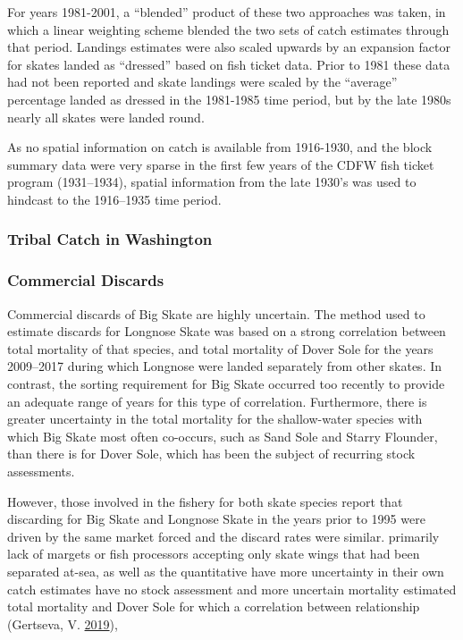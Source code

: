 \documentclass[12pt,]{article}
\begin{document}
For years 1981-2001, a ``blended'' product of these two approaches was
taken, in which a linear weighting scheme blended the two sets of catch
estimates through that period. Landings estimates were also scaled
upwards by an expansion factor for skates landed as ``dressed'' based on
fish ticket data. Prior to 1981 these data had not been reported and
skate landings were scaled by the ``average'' percentage landed as
dressed in the 1981-1985 time period, but by the late 1980s nearly all
skates were landed round.

As no spatial information on catch is available from 1916-1930, and the
block summary data were very sparse in the first few years of the CDFW
fish ticket program (1931--1934), spatial information from the late
1930's was used to hindcast to the 1916--1935 time period.

\hypertarget{tribal-catch-in-washington}{%
\subsubsection{Tribal Catch in
Washington}\label{tribal-catch-in-washington}}

\hypertarget{commercial-discards}{%
\subsubsection{Commercial Discards}\label{commercial-discards}}

Commercial discards of Big Skate are highly uncertain. The method used
to estimate discards for Longnose Skate was based on a strong
correlation between total mortality of that species, and total mortality
of Dover Sole for the years 2009--2017 during which Longnose were landed
separately from other skates. In contrast, the sorting requirement for
Big Skate occurred too recently to provide an adequate range of years
for this type of correlation. Furthermore, there is greater uncertainty
in the total mortality for the shallow-water species with which Big
Skate most often co-occurs, such as Sand Sole and Starry Flounder, than
there is for Dover Sole, which has been the subject of recurring stock
assessments.

However, those involved in the fishery for both skate species report
that discarding for Big Skate and Longnose Skate in the years prior to
1995 were driven by the same market forced and the discard rates were
similar. primarily lack of margets or fish processors accepting only
skate wings that had been separated at-sea, as well as the quantitative
have more uncertainty in their own catch estimates have no stock
assessment and more uncertain mortality estimated total mortality and
Dover Sole for which a correlation between relationship (Gertseva, V.
\protect\hyperlink{ref-Gertseva2019}{2019}),
\end{document}
